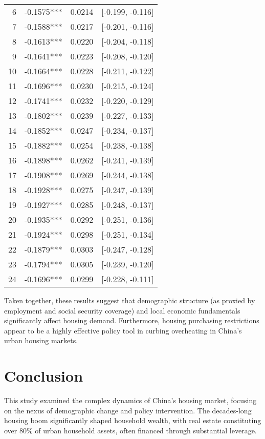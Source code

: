 \documentclass[12pt,english]{article}
\begin{document}
\begin{table}[H]
\begin{tabular}{rlrl}
			6 &  -0.1575*** &      0.0214 & [-0.199, -0.116] \\
			7 &  -0.1588*** &      0.0217 & [-0.201, -0.116] \\
			8 &  -0.1613*** &      0.0220 & [-0.204, -0.118] \\
			9 &  -0.1641*** &      0.0223 & [-0.208, -0.120] \\
			10 &  -0.1664*** &      0.0228 & [-0.211, -0.122] \\
			11 &  -0.1696*** &      0.0230 & [-0.215, -0.124] \\
			12 &  -0.1741*** &      0.0232 & [-0.220, -0.129] \\
			13 &  -0.1802*** &      0.0239 & [-0.227, -0.133] \\
			14 &  -0.1852*** &      0.0247 & [-0.234, -0.137] \\
			15 &  -0.1882*** &      0.0254 & [-0.238, -0.138] \\
			16 &  -0.1898*** &      0.0262 & [-0.241, -0.139] \\
			17 &  -0.1908*** &      0.0269 & [-0.244, -0.138] \\
			18 &  -0.1928*** &      0.0275 & [-0.247, -0.139] \\
			19 &  -0.1927*** &      0.0285 & [-0.248, -0.137] \\
			20 &  -0.1935*** &      0.0292 & [-0.251, -0.136] \\
			21 &  -0.1924*** &      0.0298 & [-0.251, -0.134] \\
			22 &  -0.1879*** &      0.0303 & [-0.247, -0.128] \\
			23 &  -0.1794*** &      0.0305 & [-0.239, -0.120] \\
			24 &  -0.1696*** &      0.0299 & [-0.228, -0.111] \\
			\bottomrule
		\end{tabular}
	\end{table}
	
	
	Taken together, these results suggest that demographic structure (as proxied by employment and social security coverage) and local economic fundamentals significantly affect housing demand. Furthermore, housing purchasing restrictions appear to be a highly effective policy tool in curbing overheating in China's urban housing markets.
	
	
	
	
	
	
	\section{Conclusion}\label{sec:conclusion}
	This study examined the complex dynamics of China's housing market, focusing on the nexus of demographic change and policy intervention. The decades-long housing boom significantly shaped household wealth, with real estate constituting over 80\% of urban household assets, often financed through substantial leverage.
	
\end{document}
